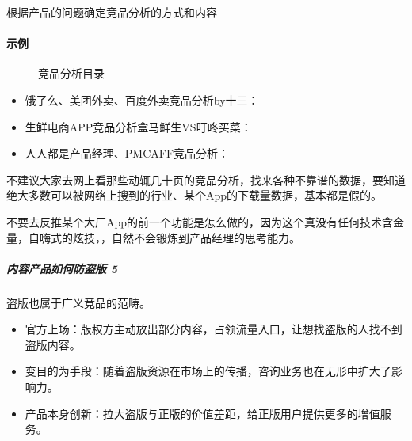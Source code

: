 \documentclass[letterpaper,11pt,english]{sphinxmanual}
\begin{document}
根据产品的问题确定竞品分析的方式和内容


\paragraph{示例}
\label{\detokenize{chapter_knowledge/goods_analysis:id29}}
\begin{figure}[H]
\centering
\capstart

\noindent{}
\caption{竞品分析目录\sphinxfootnotemark[459]}\label{\detokenize{chapter_knowledge/goods_analysis:id34}}\end{figure}
%
\begin{footnotetext}[459]\sphinxAtStartFootnote
{}
%
\end{footnotetext}\ignorespaces \begin{itemize}
\item {} 
饿了么、美团外卖、百度外卖竞品分析by十三：

\item {} 
生鲜电商APP竞品分析\sphinxhyphen{}盒马鲜生VS叮咚买菜：

\item {} 
人人都是产品经理、PMCAFF竞品分析：

\end{itemize}

不建议大家去网上看那些动辄几十页的竞品分析，找来各种不靠谱的数据，要知道绝大多数可以被网络上搜到的行业、某个App的下载量数据，基本都是假的。

不要去反推某个大厂App的前一个功能是怎么做的，因为这个真没有任何技术含金量，自嗨式的炫技，，自然不会锻炼到产品经理的思考能力。%
\begin{footnote}[460]\sphinxAtStartFootnote
{}
%
\end{footnote}


\subparagraph{内容产品如何防盗版 5\sphinxfootnotemark[461]}
\label{\detokenize{chapter_knowledge/goods_analysis:id30}}%
\begin{footnotetext}[461]\sphinxAtStartFootnote
{}
%
\end{footnotetext}\ignorespaces 
盗版也属于广义竞品的范畴。
\begin{itemize}
\item {} 
官方上场：版权方主动放出部分内容，占领流量入口，让想找盗版的人找不到盗版内容。

\item {} 
变目的为手段：随着盗版资源在市场上的传播，咨询业务也在无形中扩大了影响力。

\item {} 
产品本身创新：拉大盗版与正版的价值差距，给正版用户提供更多的增值服务。

\end{itemize}
\end{document}
